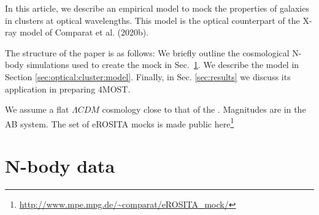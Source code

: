 \documentclass[fleqn,usenatbib,onecolumn]{mnras}
\begin{document}
In this article, we describe an empirical model to mock the properties of galaxies in clusters at optical wavelengths. 
This model is the optical counterpart of the X-ray model of Comparat et al. (2020b). 


The structure of the paper is as follows: 
We briefly outline the cosmological N-body simulations used to create the mock in Sec.~\ref{sec:nbody:data}. 
We describe the model in Section \ref{sec:optical:cluster:model}. 
Finally, in Sec. \ref{sec:results} we discuss its application in preparing 4MOST. 

We assume a flat $\Lambda CDM$ cosmology close to that of the \citet{Planck2014}. %
Magnitudes are in the AB system. 
The set of eROSITA mocks is made public here\footnote{\url{http://www.mpe.mpg.de/~comparat/eROSITA_mock/}}


%
%
%
%
\section{N-body data}
\label{sec:nbody:data}
\end{document}
